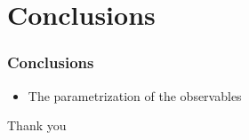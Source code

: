 \documentclass{beamer}
\begin{document}
\section{Conclusions}

\begin{frame}
\frametitle{Conclusions}
\begin{itemize}
\item The parametrization of the observables
\end{itemize}
\end{frame}






\begin{frame}
\Huge{\centerline{Thank you}}
\end{frame}
\end{document}
